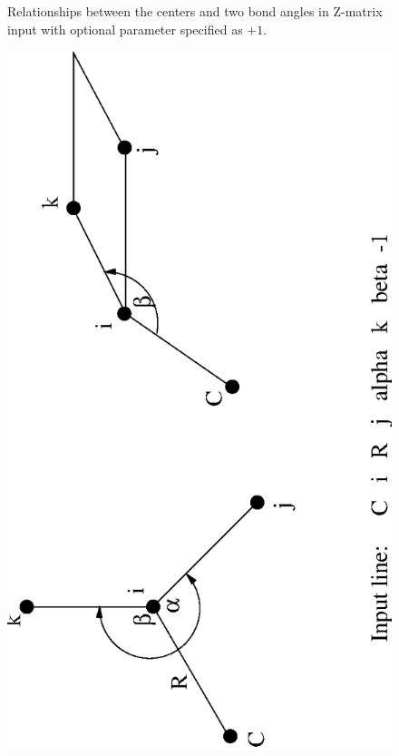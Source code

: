 \begin{figure}[htbp]
\begin{latexonly}
\fi
\end{latexonly}
\begin{htmlonly}
\end{htmlonly}

\caption{\label{fig:zmat2} Relationships between the centers and two
  bond angles in Z-matrix input with optional parameter specified as $+1$.}
\end{figure}

\begin{figure}[htbp]
\centering
\begin{latexonly}
\ifx\pdfoutput\undefined
\includegraphics[angle=270,width=6in]{zmat3.eps}

\end{latexonly}
\end{figure}
